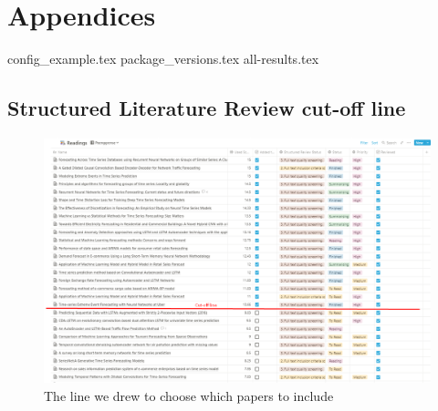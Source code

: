 
\chapter{Appendices}
\label{cha:appendices}
{config_example.tex}
{package_versions.tex}
{all-results.tex}

\section{Structured Literature Review cut-off line}
\label{cha:slr-cut-off-line}

\begin{figure}[H]
  \centering
  \includegraphics[width=\textwidth]{./figs/illustrations/LSR-cut-off-line.png}
  \hfill
  \caption{The line we drew to choose which papers to include}
  \label{fig:slr-cut-off-line}
\end{figure}

